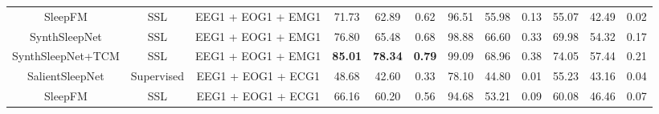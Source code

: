 \begin{table*}[!htbp]
{{\begin{tabular}{c|c|c|ccc|ccc|ccc}
SleepFM \cite{ref23}                                                                               & SSL                                                                                        & EEG1
  + EOG1 + EMG1                       & 71.73          & 62.89          & 0.62                                                                      & 96.51          & 55.98          & 0.13                                                          & 55.07          & 42.49          & 0.02                                                             \\
SynthSleepNet                                                                          & SSL                                                                                        & EEG1
  + EOG1 + EMG1                       & 76.80          & 65.48          & 0.68                                                                      & 98.88          & 66.60          & 0.33                                                          & 69.98          & 54.32          & 0.17                                                             \\
SynthSleepNet+TCM                                                                      & SSL                                                                                        & EEG1
  + EOG1 + EMG1                       & \textbf{85.01} & \textbf{78.34} & \textbf{0.79}                                                             & 99.09          & 68.96          & 0.38                                                          & 74.05          & 57.44          & 0.21                                                             \\ 
\hline
SalientSleepNet \cite{ref9}                                                                       & Supervised                                                                                 & EEG1
  + EOG1 + ECG1                       & 48.68          & 42.60          & 0.33                                                                      & 78.10          & 44.80          & 0.01                                                          & 55.23          & 43.16          & 0.04                                                             \\
SleepFM  \cite{ref23}                                                                              & SSL                                                                                        & EEG1
  + EOG1 + ECG1                       & 66.16          & 60.20          & 0.56                                                                      & 94.68          & 53.21          & 0.09                                                          & 60.08          & 46.46          & 0.07                                                             \\

\end{tabular}}}
\end{table*}
